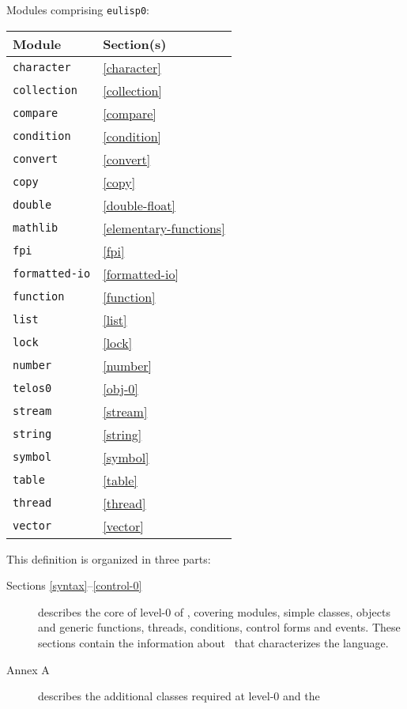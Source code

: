 \begin{optDefinition}
Modules comprising {\tt eulisp0}:
\begin{center}
    \label{level-0-modules}
    \begin{tabular}{|ll|}\hline
        Module & Section(s)\\\hline
        {\tt character} & \ref{character}\\
        {\tt collection} & \ref{collection}\\
        {\tt compare} & \ref{compare}\\
        {\tt condition} & \ref{condition}\\
        {\tt convert} & \ref{convert}\\
        {\tt copy} & \ref{copy}\\
        {\tt double} & \ref{double-float}\\
        {\tt mathlib} & \ref{elementary-functions}\\
        {\tt fpi} & \ref{fpi}\\
        {\tt formatted-io} & \ref{formatted-io}\\
        {\tt function} & \ref{function}\\
        {\tt list} & \ref{list}\\
        {\tt lock} & \ref{lock}\\
        {\tt number} & \ref{number}\\
        {\tt telos0} & \ref{obj-0}\\
        {\tt stream} & \ref{stream}\\
        {\tt string} & \ref{string}\\
        {\tt symbol} & \ref{symbol}\\
        {\tt table} & \ref{table}\\
        {\tt thread} & \ref{thread}\\
        {\tt vector} & \ref{vector}\\\hline
    \end{tabular}
\end{center}
%
\noindent
This definition is organized in three parts:
\begin{description}
    \item[Sections \ref{syntax}--\ref{control-0}] describes the core of level-0
    of \eulisp, covering modules, simple classes, objects and generic functions,
    threads, conditions, control forms and events.  These sections contain the
    information about \eulisp\ that characterizes the language.
    \item[Annex A] describes the additional classes required at level-0 and the

\end{description}
\end{optDefinition}
